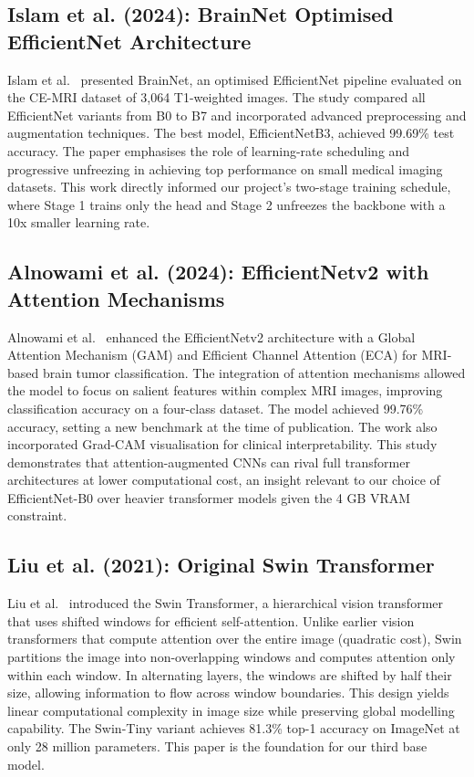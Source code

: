 \documentclass[12pt,a4paper,oneside]{report}
\begin{document}
\subsection{Islam et al. (2024): BrainNet Optimised EfficientNet Architecture}

Islam et al.~\cite{islam2024} presented BrainNet, an optimised EfficientNet pipeline evaluated on the CE-MRI dataset of 3,064 T1-weighted images. The study compared all EfficientNet variants from B0 to B7 and incorporated advanced preprocessing and augmentation techniques. The best model, EfficientNetB3, achieved 99.69\% test accuracy. The paper emphasises the role of learning-rate scheduling and progressive unfreezing in achieving top performance on small medical imaging datasets. This work directly informed our project's two-stage training schedule, where Stage 1 trains only the head and Stage 2 unfreezes the backbone with a 10x smaller learning rate.

\subsection{Alnowami et al. (2024): EfficientNetv2 with Attention Mechanisms}

Alnowami et al.~\cite{alnowami2024eff} enhanced the EfficientNetv2 architecture with a Global Attention Mechanism (GAM) and Efficient Channel Attention (ECA) for MRI-based brain tumor classification. The integration of attention mechanisms allowed the model to focus on salient features within complex MRI images, improving classification accuracy on a four-class dataset. The model achieved 99.76\% accuracy, setting a new benchmark at the time of publication. The work also incorporated Grad-CAM visualisation for clinical interpretability. This study demonstrates that attention-augmented CNNs can rival full transformer architectures at lower computational cost, an insight relevant to our choice of EfficientNet-B0 over heavier transformer models given the 4 GB VRAM constraint.

\subsection{Liu et al. (2021): Original Swin Transformer}

Liu et al.~\cite{liu2021swin} introduced the Swin Transformer, a hierarchical vision transformer that uses shifted windows for efficient self-attention. Unlike earlier vision transformers that compute attention over the entire image (quadratic cost), Swin partitions the image into non-overlapping windows and computes attention only within each window. In alternating layers, the windows are shifted by half their size, allowing information to flow across window boundaries. This design yields linear computational complexity in image size while preserving global modelling capability. The Swin-Tiny variant achieves 81.3\% top-1 accuracy on ImageNet at only 28 million parameters. This paper is the foundation for our third base model.
\end{document}
